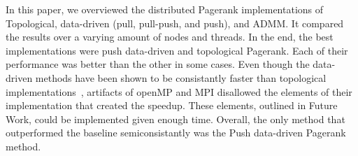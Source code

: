 \documentclass[letterpaper,11pt,onecolumn]{article}
\begin{document}
In this paper, we overviewed the distributed Pagerank implementations of Topological, data-driven (pull, pull-push, and push), and ADMM. It compared the results over a varying amount of nodes and threads. In the end, the best implementations were push data-driven and topological Pagerank. Each of their performance was better than the other in some cases. Even though the data-driven methods have been shown to be consistantly faster than topological implementations~\cite{Joyce}, artifacts of openMP and MPI disallowed the elements of their implementation that created the speedup. These elements, outlined in Future Work, could be implemented given enough time. Overall, the only method that outperformed the baseline semiconsistantly was the Push data-driven Pagerank method. 

\vfill\pagebreak


\end{document}

